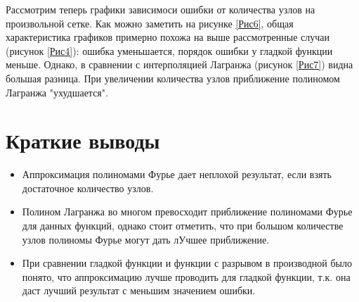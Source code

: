\documentclass[a4paper]{article}
\begin{document}
Рассмотрим теперь графики зависимоси ошибки от количества узлов на произвольной сетке. Как можно заметить на рисунке \ref{Рис6}, общая характеристика графиков примерно похожа на выше рассмотренные случаи (рисунок \ref{Рис4}): ошибка уменьшается, порядок ошибки у гладкой функции меньше. Однако, в сравнении с интерполяцией Лагранжа (рисунок \ref{Рис7}) видна большая разница. При увеличении количества узлов приближение полиномом Лагранжа "ухудшается".


\newpage
\section{Краткие выводы} 

\begin{itemize}
  \item Аппроксимация полиномами Фурье дает неплохой результат, если взять достаточное количество узлов.
  \item Полином Лагранжа во многом превосходит приближение полиномами Фурье для данных функций, однако стоит отметить, что при большом количестве узлов полиномы Фурье могут дать лУчшее приближение.
  \item При сравнении гладкой функции и функции с разрывом в производной было понято, что аппроксимацию лучше проводить для гладкой функции, т.к. она даст лучший результат с меньшим значением ошибки.
  
\end{itemize}
\end{document}

